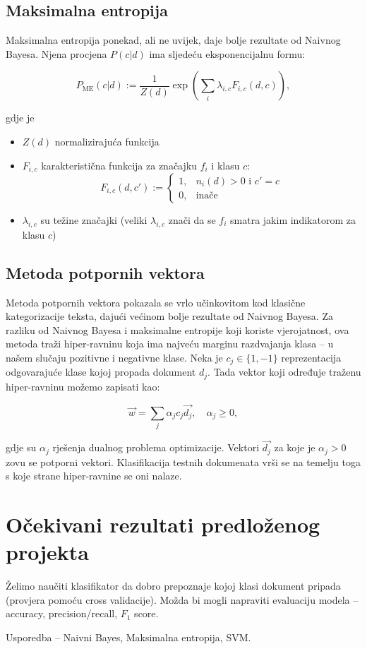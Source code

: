 \documentclass[12pt,a4paper,titlepage]{article}
\begin{document}
\subsection{Maksimalna entropija}

Maksimalna entropija ponekad, ali ne uvijek, daje bolje rezultate od Naivnog Bayesa. Njena procjena $P(c|d)$ ima sljedeću eksponencijalnu formu:

\[
  P_\text{ME}(c|d) := \frac{1}{Z(d)} \exp \left(\sum_i \lambda_{i,c} F_{i,c}(d,c)\right),
\]

gdje je

\begin{itemize}
  \item $Z(d)$ normalizirajuća funkcija
  \item $F_{i,c}$ karakteristična funkcija za značajku $f_i$ i klasu $c$:
    \[
      F_{i,c}(d,c') := \begin{cases}
                         1, & n_i(d) > 0 \text{ i } c' = c\\
                         0, & \text{inače}
                       \end{cases}
    \]
  \item $\lambda_{i,c}$ su težine značajki (veliki $\lambda_{i,c}$ znači da se $f_i$ smatra jakim indikatorom za klasu $c$)
\end{itemize}

\subsection{Metoda potpornih vektora}

Metoda potpornih vektora pokazala se vrlo učinkovitom kod klasične kategorizacije teksta, dajući većinom bolje rezultate od Naivnog Bayesa. Za razliku od Naivnog Bayesa i maksimalne entropije koji koriste vjerojatnost, ova metoda traži hiper-ravninu koja ima najveću marginu razdvajanja klasa -- u našem slučaju pozitivne i negativne klase. Neka je $c_j \in \{1, -1\}$ reprezentacija odgovarajuće klase kojoj propada dokument $d_j$. Tada vektor koji određuje traženu hiper-ravninu možemo zapisati kao:

\[
	\vec{w} = \sum_j \alpha_j c_j \vec{d_j}, \quad \alpha_j \ge 0,
\]

gdje su $\alpha_j$ rješenja dualnog problema optimizacije. Vektori $\vec{d_j}$ za koje je $\alpha_j > 0$ zovu se potporni vektori. Klasifikacija testnih dokumenata vrši se na temelju toga s koje strane hiper-ravnine se oni nalaze.

\section{Očekivani rezultati predloženog projekta}

Želimo naučiti klasifikator da dobro prepoznaje kojoj klasi dokument pripada (provjera pomoću cross validacije). Možda bi mogli napraviti evaluaciju modela -- accuracy, precision/recall, $F_1$ score.

Usporedba -- Naivni Bayes, Maksimalna entropija, SVM.

\newpage

\nocite{*}



\end{document}
